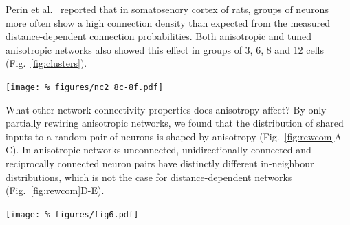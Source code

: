 Perin et al.~\cite{Perin2011} reported that in somatosenory cortex of
rats, groups of neurons more often show a high connection density than
expected from the measured distance-dependent connection
probabilities. Both anisotropic and tuned anisotropic networks also
showed this effect in groups of 3, 6, 8 and 12 cells
(Fig.~\ref{fig:clusters}).

\begin{center}\vspace{0.01cm}
  \texttt{[image: \%
    figures/nc2\_8c-8f.pdf]} 
  \label{fig:clusters}
\end{center}\vspace{2cm}

What other network connectivity properties does anisotropy affect? By
only partially rewiring anisotropic networks, we found that the
distribution of shared inputs to a random pair of neurons is shaped by
anisotropy (Fig.~\ref{fig:rewcom}A-C). In anisotropic networks
unconnected, unidirectionally connected and reciprocally connected
neuron pairs have distinctly different in-neighbour distributions,
which is not the case for distance-dependent networks
(Fig.~\ref{fig:rewcom}D-E).

\begin{center}\vspace{0.01cm}
  \texttt{[image: \%
    figures/fig6.pdf]} 
  \label{fig:rewcom}
\end{center}\vspace{2cm}





